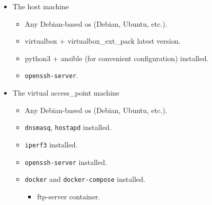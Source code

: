 \begin{itemize}
\tightlist
\item
The host machine

\begin{itemize}
	\tightlist
	\item
	Any Debian-based \acrshort{os} (Debian, Ubuntu, etc.).
	\item
	\gls{virtualbox} + \gls{virtualbox_ext_pack} latest version.
	\item
	\gls{python3} + \gls{ansible} (for convenient configuration) installed.
	\item
	\texttt{openssh-server}.
\end{itemize}
\item
  The virtual \gls{access_point} machine

  \begin{itemize}
  \tightlist
  \item
    Any Debian-based \acrshort{os} (Debian, Ubuntu, etc.).
  \item
    \texttt{dnsmasq}, \texttt{hostapd} installed.
  \item
    \texttt{iperf3} installed.
  \item
    \texttt{openssh-server} installed.
  \item
    \texttt{docker} and \texttt{docker-compose} installed.

    \begin{itemize}
    \tightlist
    \item
      \acrshort{ftp}-server container.
    \end{itemize}
  \end{itemize}
\end{itemize}
